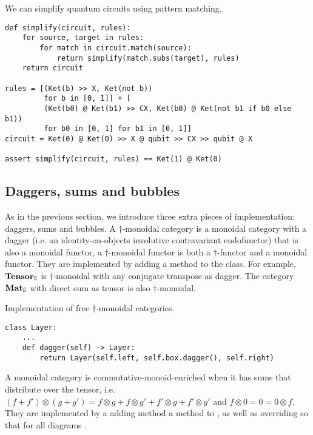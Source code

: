 \begin{example}
We can simplify quantum circuits using pattern matching.

\begin{verbatim}
def simplify(circuit, rules):
    for source, target in rules:
        for match in circuit.match(source):
            return simplify(match.subs(target), rules)
    return circuit

rules = [(Ket(b) >> X, Ket(not b))
         for b in [0, 1]] + [
         (Ket(b0) @ Ket(b1) >> CX, Ket(b0) @ Ket(not b1 if b0 else b1))
         for b0 in [0, 1] for b1 in [0, 1]]
circuit = Ket(0) @ Ket(0) >> X @ qubit >> CX >> qubit @ X

assert simplify(circuit, rules) == Ket(1) @ Ket(0)
\end{verbatim}
\end{example}

\subsection{Daggers, sums and bubbles}

As in the previous section, we introduce three extra pieces of implementation: daggers, sums and bubbles.
A $\dagger$-monoidal category is a monoidal category with a dagger (i.e. an identity-on-objects involutive contravariant endofunctor) that is also a monoidal functor, a $\dagger$-monoidal functor is both a $\dagger$-functor and a monoidal functor.
They are implemented by adding a  method to the  class.
For example, $\mathbf{Tensor}_\S$ is $\dagger$-monoidal with any conjugate transpose as dagger.
The category $\mathbf{Mat}_\S$ with direct sum as tensor is also $\dagger$-monoidal.

\begin{python}
{\normalfont Implementation of free $\dagger$-monoidal categories.}

\begin{verbatim}
class Layer:
    ...
    def dagger(self) -> Layer:
        return Layer(self.left, self.box.dagger(), self.right)
\end{verbatim}
\end{python}

A monoidal category is commutative-monoid-enriched when it has sums that distribute over the tensor, i.e.
$(f + f') \otimes (g + g') = f \otimes g + f \otimes g' + f' \otimes g + f' \otimes g'$
and $f \otimes 0 = 0 = 0 \otimes f$.
They are implemented by a adding method a  method to , as well as overriding  so that  for all diagrams .

